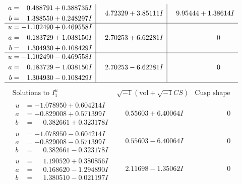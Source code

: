 \documentclass[1p]{elsarticle_modified}
\theoremstyle{definition}
\newcommand{\I}{\sqrt{-1}}
\begin{document}
$$\begin{array}{c|c|c}
\begin{aligned}
a &= \phantom{-}0.488791 + 0.388735 I \\
b &= \phantom{-}1.388550 + 0.248297 I\end{aligned}
 & \phantom{-}4.72329 + 3.85111 I & \phantom{-}9.95444 + 1.38614 I \\ \hline\begin{aligned}
u &= -1.102490 + 0.469558 I \\
a &= \phantom{-}0.183729 + 1.038150 I \\
b &= \phantom{-}1.304930 + 0.108429 I\end{aligned}
 & \phantom{-}2.70253 + 6.62281 I & \phantom{-0.000000 } 0 \\ \hline\begin{aligned}
u &= -1.102490 - 0.469558 I \\
a &= \phantom{-}0.183729 - 1.038150 I \\
b &= \phantom{-}1.304930 - 0.108429 I\end{aligned}
 & \phantom{-}2.70253 - 6.62281 I & \phantom{-0.000000 } 0\\
 \hline 
 \end{array}$$\newpage$$\begin{array}{c|c|c}  
\text{Solutions to }I^u_{1}& \I (\text{vol} + \sqrt{-1}CS) & \text{Cusp shape}\\
 \hline 
\begin{aligned}
u &= -1.078950 + 0.604214 I \\
a &= -0.829008 + 0.571399 I \\
b &= \phantom{-}0.382661 + 0.323178 I\end{aligned}
 & \phantom{-}0.55603 + 6.40064 I & \phantom{-0.000000 } 0 \\ \hline\begin{aligned}
u &= -1.078950 - 0.604214 I \\
a &= -0.829008 - 0.571399 I \\
b &= \phantom{-}0.382661 - 0.323178 I\end{aligned}
 & \phantom{-}0.55603 - 6.40064 I & \phantom{-0.000000 } 0 \\ \hline\begin{aligned}
u &= \phantom{-}1.190520 + 0.380856 I \\
a &= \phantom{-}0.168620 - 1.294890 I \\
b &= \phantom{-}1.380510 - 0.021197 I\end{aligned}
 & \phantom{-}2.11698 - 1.35062 I & \phantom{-0.000000 } 0 \\ \hline\begin{aligned}

\end{aligned}
\end{array}$$
\end{document}
